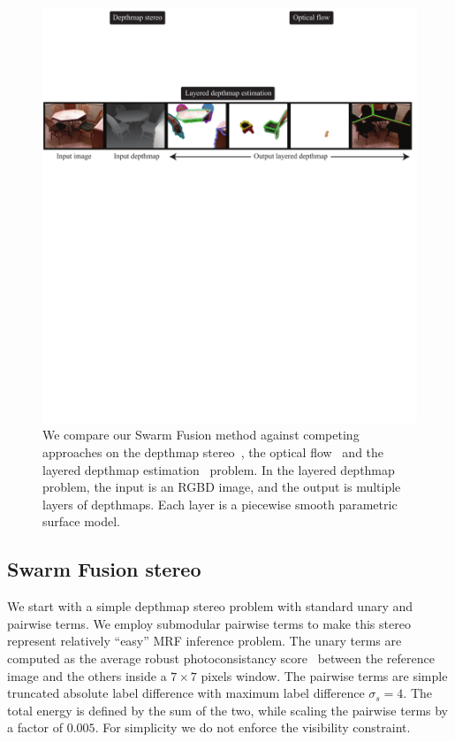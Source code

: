%
\begin{figure}[tb]
  \includegraphics[width=\columnwidth]{figure/problem.pdf} \caption{We
    compare our Swarm Fusion method against competing approaches on the
    depthmap stereo~\cite{middlebury_stereo}, the optical
    flow~\cite{middlebury_optical_flow} and the layered depthmap
    estimation~\cite{layered_depthmap} problem. In the layered
    depthmap problem, the input is an RGBD image, and the output is
    multiple layers of depthmaps. Each layer is a piecewise smooth
    parametric surface model.}\label{fig:problem}
\end{figure}
%
%
%
\subsection{Swarm Fusion stereo}
We start with a simple depthmap stereo problem with standard unary and
pairwise terms. We employ submodular pairwise terms to make this
stereo represent relatively ``easy'' MRF inference problem.
%
The unary terms are computed as the average robust photoconsistancy
score~\cite{second_order_stereo} between the reference image and the others
inside a $7\times 7$ pixels window. The pairwise terms are simple
truncated absolute label difference with maximum label difference
$\sigma_s=4$. The total energy is defined by the sum of the two, while
scaling the pairwise terms by a factor of $0.005$. For simplicity we
do not enforce the visibility constraint.

